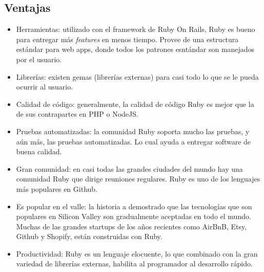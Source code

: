 \documentclass{IEEEtran}
\begin{document}
\subsection{Ventajas}
\begin{itemize}
  \item Herramientas: utilizado con el framework de Ruby On Rails, Ruby es bueno para entregar m\'as \emph{features} en menos tiempo. Provee de una estructura est\'andar para web apps, donde todos los patrones esnt\'andar son manejados por el usuario.
  \item Librer\'ias: existen gemas (librer\'ias externas) para casi todo lo que se le pueda ocurrir al usuario.
  \item Calidad de c\'odigo: generalmente, la calidad de c\'odigo Ruby es mejor que la de sus contrapartes en PHP o NodeJS.
  \item Pruebas automatizadas: la comunidad Ruby soporta mucho las pruebas, y a\'un m\'as, las pruebas automatizadas. Lo cual ayuda a entregar software de buena calidad.
  \item Gran comunidad: en casi todas las grandes ciudades del mundo hay una comunidad Ruby que dirige reuniones regulares. Ruby es uno de los lenguajes m\'as populares en Github.
  \item Es popular en el valle: la historia a demostrado que las tecnolog\'ias que son populares en Silicon Valley son gradualmente aceptadas en todo el mundo. Muchas de las grandes startups de los a\~nos recientes como AirBnB, Etsy, Github y Shopify, est\'an construidas con Ruby.
  \item Productividad: Ruby es un lenguaje elocuente, lo que combinado con la gran variedad de librer\'ias externas, habilita al programador al desarrollo r\'apido.
\end{itemize}
\end{document}
